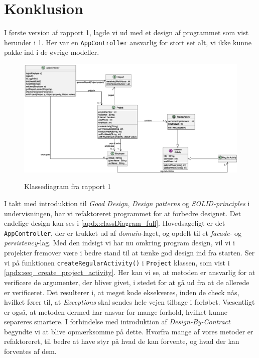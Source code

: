 \section{Konklusion} \label{chap:conclusion}
I første version af rapport 1, lagde vi ud med et design af programmet som vist herunder i \cref{fig:class_report1}. Her var en \texttt{AppController} ansvarlig for stort set alt, vi ikke kunne pakke ind i de øvrige modeller.
\begin{figure}[H]
    \centering
    \caption{Klassediagram fra rapport 1}
    \includegraphics[width = \textwidth]{RequirementsAndDesign/Diagrams/ClassDiagram.eps}
    \label{fig:class_report1}
\end{figure}
I takt med introduktion til \textit{Good Design}, \textit{Design patterns} og \textit{SOLID-principles} i undervisningen, har vi refaktoreret programmet for at forbedre designet. Det endelige design kan ses i \cref{apdx:classDiagram_full}. Hovedsageligt er det \texttt{AppController}, der er trukket ud af \textit{domain}-laget, og opdelt til et \textit{facade}- og \textit{persistency}-lag. Med den indsigt vi har nu omkring program design, vil vi i projekter fremover være i bedre stand til at tænke god design ind fra starten.
Ser vi på funktionen \texttt{createRegularActivity()} i \texttt{Project} klassen, som vist i \cref{apdx:seq_create_project_activity}. Her kan vi se, at metoden er ansvarlig for at verificere de argumenter, der bliver givet, i stedet for at gå ud fra at de allerede er verificeret. Det resulterer i, at meget kode eksekveres, inden de check nås, hvilket fører til, at \textit{Exceptions} skal sendes hele vejen tilbage i forløbet. Væsentligt er også, at metoden dermed har ansvar for mange forhold, hvilket kunne separeres smartere. I forbindelse med introduktion af \textit{Design-By-Contract} begyndte vi at blive opmærksomme på dette. Hvorfra mange af vores metoder er refaktoreret, til bedre at have styr på hvad de kan forvente, og hvad der kan forventes af dem.\newline
